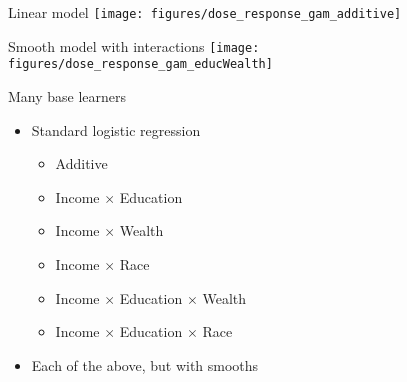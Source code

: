\documentclass{beamer}
\begin{document}
\begin{frame}{Linear model}
\texttt{[image: figures/dose\_response\_gam\_additive]}
\end{frame}

\begin{frame}{Smooth model with interactions}
\texttt{[image: figures/dose\_response\_gam\_educWealth]}
\end{frame}

\begin{frame}{Many base learners}

\begin{itemize}
\item Standard logistic regression
\begin{itemize}
\item Additive
\item Income $\times$ Education
\item Income $\times$ Wealth
\item Income $\times$ Race
\item Income $\times$ Education $\times$ Wealth
\item Income $\times$ Education $\times$ Race
\end{itemize}
\item Each of the above, but with smooths
\end{itemize}

\end{frame}
\end{document}
